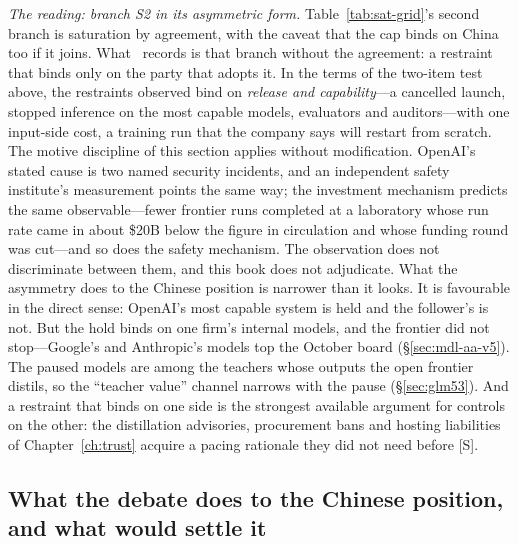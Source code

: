 \emph{The reading: branch S2 in its asymmetric form.} Table~\ref{tab:sat-grid}'s second branch is saturation by agreement, with the caveat that the cap binds on China too if it joins. What \datafreeze\ records is that branch without the agreement: a restraint that binds only on the party that adopts it. In the terms of the two-item test above, the restraints observed bind on \emph{release and capability}---a cancelled launch, stopped inference on the most capable models, evaluators and auditors---with one input-side cost, a training run that the company says will restart from scratch. The motive discipline of this section applies without modification. OpenAI's stated cause is two named security incidents, and an independent safety institute's measurement points the same way; the investment mechanism predicts the same observable---fewer frontier runs completed at a laboratory whose run rate came in about \$20B below the figure in circulation and whose funding round was cut---and so does the safety mechanism. The observation does not discriminate between them, and this book does not adjudicate. What the asymmetry does to the Chinese position is narrower than it looks. It is favourable in the direct sense: OpenAI's most capable system is held and the follower's is not. But the hold binds on one firm's internal models, and the frontier did not stop---Google's and Anthropic's models top the October board (\S\ref{sec:mdl-aa-v5}). The paused models are among the teachers whose outputs the open frontier distils, so the ``teacher value'' channel narrows with the pause (\S\ref{sec:glm53}). And a restraint that binds on one side is the strongest available argument for controls on the other: the distillation advisories, procurement bans and hosting liabilities of Chapter~\ref{ch:trust} acquire a pacing rationale they did not need before [S].

\subsection{What the debate does to the Chinese position, and what would settle it}

